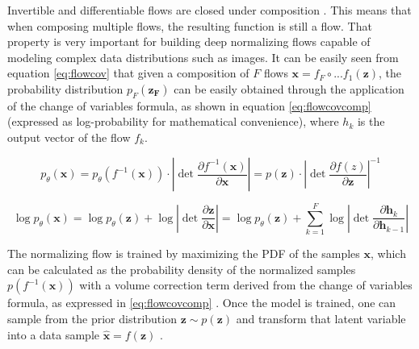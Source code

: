 Invertible and differentiable flows are closed under composition \autocite{kobyzev}. This means that when composing multiple flows, the resulting function is still a flow. That property is very important for building deep normalizing flows capable of modeling complex data distributions such as images. It can be easily seen from equation \ref{eq:flowcov}  \autocite{rezende2015} that given a composition of $F$ flows $\mathbf{x}=f_F \circ ... f_1(\mathbf{z})$, the probability distribution $p_F(\mathbf{z_F})$ can be easily obtained through the application of the change of variables formula, as shown in equation \ref{eq:flowcovcomp} (expressed as log-probability for mathematical convenience), where $h_k$ is the output vector of the flow $f_k$.


\begin{equation}
\label{eq:flowcov}
p_\theta(\mathbf{x}) = p_\theta(f^{-1}(\mathbf{x})) \cdot \left| \det \frac{\partial f^{-1}(\mathbf{x})}{\partial \mathbf{x}} \right| = p(\mathbf{z}) \cdot \left| \det \frac{\partial f(z)}{\partial \mathbf{z}} \right|^{-1}
\end{equation}


\begin{equation}
\label{eq:flowcovcomp}
\log p_\theta(\mathbf{x}) 
= \log p_\theta(\mathbf{z}) + \log  \left| \det \frac{\partial \mathbf{z}}{\partial \mathbf{x}} \right| 
= \log p_\theta(\mathbf{z}) + \sum_{k=1}^{F} \log  \left| \det \frac{\partial \mathbf{h}_k}{\partial \mathbf{h}_{k-1}} \right| 
\end{equation}


The normalizing flow is trained by maximizing the PDF of the samples $\mathbf{x}$, which can be calculated as the probability density of the normalized samples $p(f^{-1}(\mathbf{x}))$ with a volume correction term derived from the change of variables formula, as expressed in \ref{eq:flowcovcomp} \autocite{papamakarios2017}. Once the model is trained, one can sample from the prior distribution $\mathbf{z} \sim p(\mathbf{z})$ and transform that latent variable into a data sample $\hat{\mathbf{x}} = f(\mathbf{z})$ \autocite{rezende2015}.

